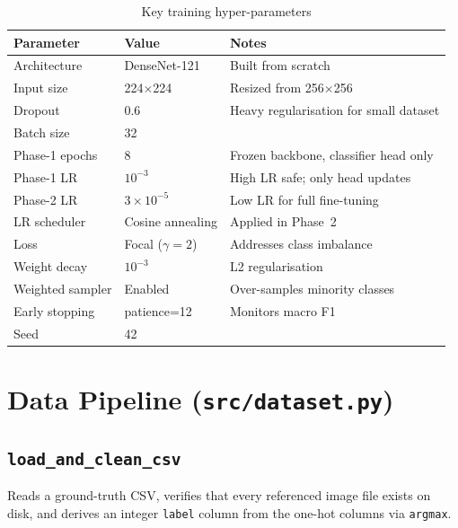 \documentclass[12pt,a4paper]{report}
\begin{document}
\begin{table}[ht]
  \centering
  \caption{Key training hyper-parameters}
  \label{tab:config}
  \begin{tabular}{lll}
    \toprule
    \textbf{Parameter} & \textbf{Value} & \textbf{Notes} \\
    \midrule
    Architecture        & DenseNet-121       & Built from scratch \\
    Input size          & 224$\times$224     & Resized from 256$\times$256 \\
    Dropout             & 0.6                & Heavy regularisation for small dataset \\
    Batch size          & 32                 & \\
    Phase-1 epochs      & 8                  & Frozen backbone, classifier head only \\
    Phase-1 LR          & $10^{-3}$          & High LR safe; only head updates \\
    Phase-2 LR          & $3\times10^{-5}$   & Low LR for full fine-tuning \\
    LR scheduler        & Cosine annealing   & Applied in Phase~2 \\
    Loss                & Focal ($\gamma=2$) & Addresses class imbalance \\
    Weight decay        & $10^{-3}$          & L2 regularisation \\
    Weighted sampler    & Enabled            & Over-samples minority classes \\
    Early stopping      & patience=12        & Monitors macro F1 \\
    Seed                & 42                 & \\
    \bottomrule
  \end{tabular}
\end{table}

\section{Data Pipeline (\texttt{src/dataset.py})}

\subsection{\texttt{load\_and\_clean\_csv}}
Reads a ground-truth CSV, verifies that every referenced image file exists on disk, and derives an integer \texttt{label} column from the one-hot columns via \texttt{argmax}.
\end{document}
